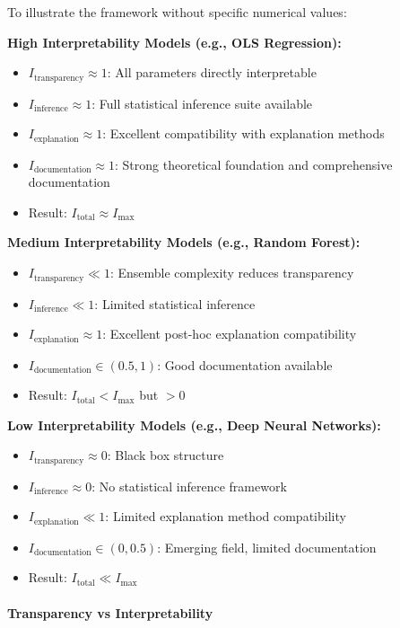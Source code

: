 \documentclass[11pt,a4paper]{article}
\begin{document}
To illustrate the framework without specific numerical values:

\textbf{High Interpretability Models (e.g., OLS Regression):}
\begin{itemize}
    \item $I_{\text{transparency}} \approx 1$: All parameters directly interpretable
    \item $I_{\text{inference}} \approx 1$: Full statistical inference suite available
    \item $I_{\text{explanation}} \approx 1$: Excellent compatibility with explanation methods
    \item $I_{\text{documentation}} \approx 1$: Strong theoretical foundation and comprehensive documentation
    \item Result: $I_{\text{total}} \approx I_{\max}$
\end{itemize}

\textbf{Medium Interpretability Models (e.g., Random Forest):}
\begin{itemize}
    \item $I_{\text{transparency}} \ll 1$: Ensemble complexity reduces transparency
    \item $I_{\text{inference}} \ll 1$: Limited statistical inference
    \item $I_{\text{explanation}} \approx 1$: Excellent post-hoc explanation compatibility
    \item $I_{\text{documentation}} \in (0.5, 1)$: Good documentation available
    \item Result: $I_{\text{total}} < I_{\max}$ but $> 0$
\end{itemize}

\textbf{Low Interpretability Models (e.g., Deep Neural Networks):}
\begin{itemize}
    \item $I_{\text{transparency}} \approx 0$: Black box structure
    \item $I_{\text{inference}} \approx 0$: No statistical inference framework
    \item $I_{\text{explanation}} \ll 1$: Limited explanation method compatibility
    \item $I_{\text{documentation}} \in (0, 0.5)$: Emerging field, limited documentation
    \item Result: $I_{\text{total}} \ll I_{\max}$
\end{itemize}

\paragraph{Transparency vs Interpretability}
\end{document}
